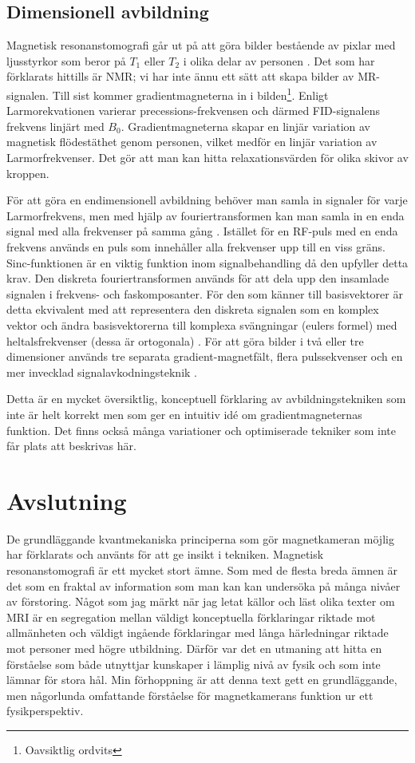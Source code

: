 \documentclass[11pt, a4paper]{article}
\begin{document}
\subsection{Dimensionell avbildning}
Magnetisk resonanstomografi går ut på att göra bilder bestående av pixlar med ljusstyrkor som beror på $T_1$ eller $T_2$ i olika delar av personen \parencite{understanding_mri}. Det som har förklarats hittills är NMR; vi har inte ännu ett sätt att skapa bilder av MR-signalen. Till sist kommer gradientmagneterna in i bilden\footnote{Oavsiktlig ordvits}. Enligt Larmorekvationen varierar precessions-frekvensen och därmed FID-signalens frekvens linjärt med $B_0$. Gradientmagneterna skapar en linjär variation av magnetisk flödestäthet genom personen, vilket medför en linjär variation av Larmorfrekvenser. Det gör att man kan hitta relaxationsvärden för olika skivor av kroppen. 

För att göra en endimensionell avbildning behöver man samla in signaler för varje Larmorfrekvens, men med hjälp av fouriertransformen kan man samla in en enda signal med alla frekvenser på samma gång \parencite{mri_lärobok}. Istället för en RF-puls med en enda frekvens används en puls som innehåller alla frekvenser upp till en viss gräns. Sinc-funktionen är en viktig funktion inom signalbehandling då den upfyller detta krav. Den diskreta fouriertransformen används för att dela upp den insamlade signalen i frekvens- och faskomposanter. För den som känner till basisvektorer är detta ekvivalent med att representera den diskreta signalen som en komplex vektor och ändra basisvektorerna till komplexa svängningar (eulers formel) med heltalsfrekvenser (dessa är ortogonala) \parencite{dsp_bok_kapitel}. För att göra bilder i två eller tre dimensioner används tre separata gradient-magnetfält, flera pulssekvenser och en mer invecklad signalavkodningsteknik \parencite{mri_lärobok}. 

Detta är en mycket översiktlig, konceptuell förklaring av avbildningstekniken som inte är helt korrekt men som ger en intuitiv idé om gradientmagneternas funktion. Det finns också många variationer och optimiserade tekniker som inte får plats att beskrivas här.

\clearpage
\section{Avslutning}
De grundläggande kvantmekaniska principerna som gör magnetkameran möjlig har förklarats och använts för att ge insikt i tekniken. Magnetisk resonanstomografi är ett mycket stort ämne. Som med de flesta breda ämnen är det som en fraktal av information som man kan kan undersöka på många nivåer av förstoring. Något som jag märkt när jag letat källor och läst olika texter om MRI är en segregation mellan väldigt konceptuella förklaringar riktade mot allmänheten och väldigt ingående förklaringar med långa härledningar riktade mot personer med högre utbildning. Därför var det en utmaning att hitta en förståelse som både utnyttjar kunskaper i lämplig nivå av fysik och som inte lämnar för stora hål.  Min förhoppning är att denna text gett en grundläggande, men någorlunda omfattande förståelse för magnetkamerans funktion ur ett fysikperspektiv.


\clearpage
\printbibliography
\end{document}
